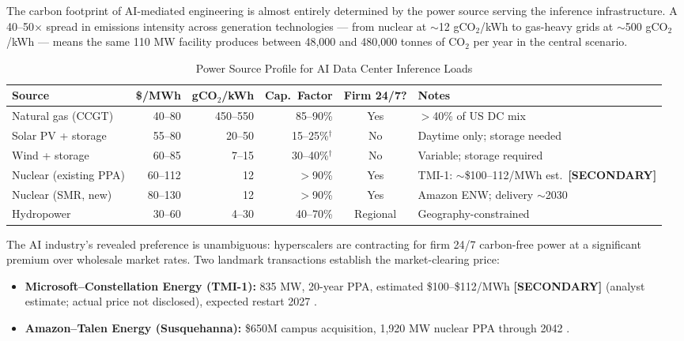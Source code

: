 \documentclass{article}
\newcommand{\SECONDARY}{\textbf{[SECONDARY]}}
\begin{document}
The carbon footprint of AI-mediated engineering is almost entirely determined by the power
source serving the inference infrastructure. A 40--50$\times$ spread in emissions intensity
across generation technologies --- from nuclear at $\sim$12 gCO$_2$/kWh to gas-heavy grids
at $\sim$500 gCO$_2$/kWh --- means the same 110 MW facility produces between 48,000 and
480,000 tonnes of CO$_2$ per year in the central scenario.

\begin{table}[ht]
\centering
\caption{Power Source Profile for AI Data Center Inference Loads}
\label{tab:power-sources}
\small
\begin{tabular}{@{}p{3.5cm}rrrcp{3.2cm}@{}}
\toprule
\textbf{Source} & \textbf{\$/MWh} & \textbf{gCO$_2$/kWh} & \textbf{Cap.\ Factor} & \textbf{Firm 24/7?} & \textbf{Notes} \\
\midrule
Natural gas (CCGT) & 40--80 & 450--550 & 85--90\% & Yes & $>$40\% of US DC mix \citep{iea2024energy} \\
Solar PV + storage & 55--80 & 20--50 & 15--25\%$^\dagger$ & No & Daytime only; storage needed \\
Wind + storage & 60--85 & 7--15 & 30--40\%$^\dagger$ & No & Variable; storage required \\
Nuclear (existing PPA) & 60--112 & 12 & $>$90\% & Yes & TMI-1: $\sim$\$100--112/MWh est.\ \SECONDARY{} \citep{constellation2024tmi} \\
Nuclear (SMR, new) & 80--130 & 12 & $>$90\% & Yes & Amazon ENW; delivery $\sim$2030 \citep{amazon2024smr} \\
Hydropower & 30--60 & 4--30 & 40--70\% & Regional & Geography-constrained \\
\bottomrule
\end{tabular}
\end{table}

The AI industry's revealed preference is unambiguous: hyperscalers are contracting for firm
24/7 carbon-free power at a significant premium over wholesale market rates. Two landmark
transactions establish the market-clearing price:

\begin{itemize}
  \item \textbf{Microsoft--Constellation Energy (TMI-1):} 835 MW, 20-year PPA,
    estimated \$100--\$112/MWh \SECONDARY{} (analyst estimate; actual price not disclosed),
    expected restart 2027 \citep{constellation2024tmi}.
  \item \textbf{Amazon--Talen Energy (Susquehanna):} \$650M campus acquisition,
    1,920 MW nuclear PPA through 2042 \citep{talen2024susquehanna}.
\end{itemize}
\end{document}
